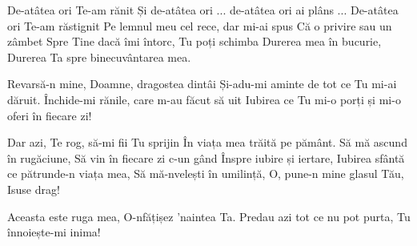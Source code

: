 
\beginverse
De-atâtea ori Te-am rănit
Și de-atâtea ori ... de-atâtea ori ai plâns ...
De-atâtea ori Te-am răstignit
Pe lemnul meu cel rece, dar mi-ai spus
Că o privire sau un zâmbet
Spre Tine dacă îmi întorc, Tu poți schimba
Durerea mea în bucurie,
Durerea Ta spre binecuvântarea mea.
\endverse

\beginchorus
Revarsă-n mine, Doamne, dragostea dintâi
Și-adu-mi aminte de tot ce Tu mi-ai dăruit.
Închide-mi rănile, care m-au făcut să uit
Iubirea ce Tu mi-o porți și mi-o oferi în fiecare zi!
\endchorus

\beginverse
Dar azi, Te rog, să-mi fii Tu sprijin
În viața mea trăită pe pământ.
Să mă ascund în rugăciune,
Să vin în fiecare zi c-un gând
Înspre iubire și iertare,
Iubirea sfântă ce pătrunde-n viața mea,
Să mă-nvelești în umilință,
O, pune-n mine glasul Tău, Isuse drag!
\endverse

\beginchorus
Aceasta este ruga mea,
O-nfățișez ’naintea Ta.
Predau azi tot ce nu pot purta,
Tu înnoiește-mi inima!
\endchorus

\endsong